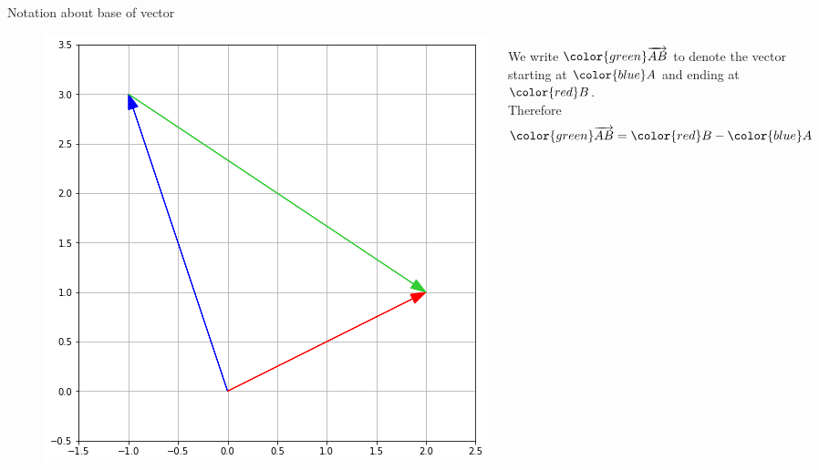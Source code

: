 \documentclass{beamer}
\begin{document}
\begin{frame}{Notation about base of vector}
  \begin{figure}
    \begin{columns}
      \hspace{-1cm}
      \includegraphics[scale=0.4]{graphicalvector.png}
       \begin{definition}
    We write ${\color{green}\overrightarrow {AB}}$ to denote the vector starting at ${\color{blue}A}$ and ending at ${\color{red}B}$.\\
    Therefore
    \begin{equation*}
      {\color{green}\overrightarrow {AB}} = {\color{red}B}-{\color{blue}A}
    \end{equation*}
  \end{definition}
    \end{columns}
  \end{figure}
\end{frame}
\end{document}
